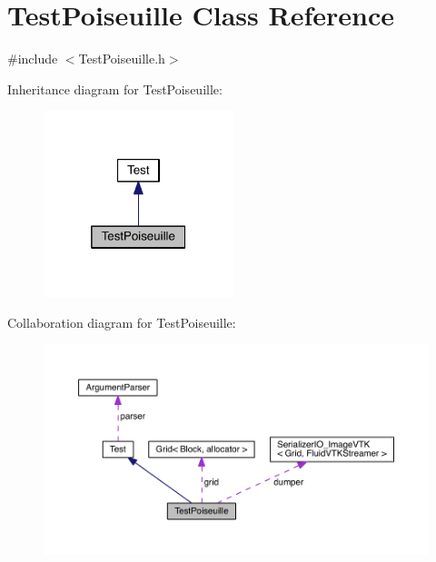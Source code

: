 \hypertarget{class_test_poiseuille}{}\section{Test\+Poiseuille Class Reference}
\label{class_test_poiseuille}


{\ttfamily \#include $<$Test\+Poiseuille.\+h$>$}



Inheritance diagram for Test\+Poiseuille\+:\nopagebreak
\begin{figure}[H]
\begin{center}
\leavevmode
\includegraphics[width=157pt]{d3/ded/class_test_poiseuille__inherit__graph}
\end{center}
\end{figure}


Collaboration diagram for Test\+Poiseuille\+:\nopagebreak
\begin{figure}[H]
\begin{center}
\leavevmode
\includegraphics[width=350pt]{d3/d21/class_test_poiseuille__coll__graph}
\end{center}
\end{figure}
